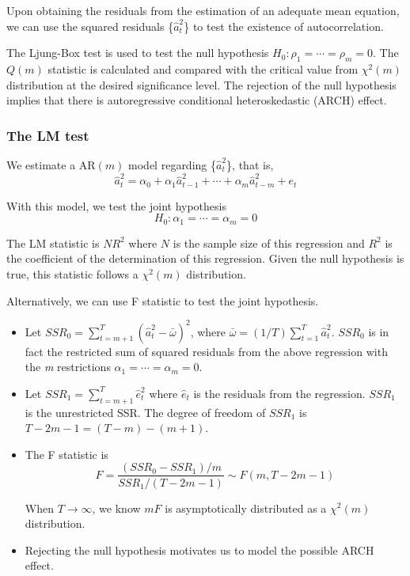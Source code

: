 \documentclass[a4paper,11pt]{article}
\begin{document}
Upon obtaining the residuals from the estimation
of an adequate mean equation, we can use the squared residuals
\{\(\hat{a}_t^2\)\} to test the existence of autocorrelation. 

The Ljung-Box test is used to test the null hypothesis
\(H_0: \rho_1 = \cdots = \rho_m = 0\). The \(Q(m)\) statistic is
calculated and compared with the critical value from \(\chi^2(m)\)
distribution at the desired significance level. The rejection of the
null hypothesis implies that there is autoregressive conditional
heteroskedastic (ARCH) effect. 

\subsubsection*{The LM test}
\label{sec:orgd511c79}

We estimate a AR\((m)\) model regarding \{\(\hat{a}^2_t\)\}, that is,
\[ \hat{a}^2_t = \alpha_0 + \alpha_1 \hat{a}_{t-1}^2 + \cdots +
\alpha_m \hat{a}^2_{t-m} + e_t \]

With this model, we test the joint hypothesis
\[H_0: \alpha_1 = \cdots = \alpha_m = 0 \]

The LM statistic is \(NR^2\) where \(N\) is the sample size of this
regression and \(R^2\) is the coefficient of the determination of this
regression. Given the null hypothesis is true, this statistic follows
a \(\chi^2(m)\) distribution. 

Alternatively, we can use F statistic to test the joint
hypothesis. 
\begin{itemize}
\item Let \(SSR_0 = \sum_{t=m+1}^{T} (\hat{a}^2_{t} -
  \bar{\omega})^2\), where \(\bar{\omega} = (1/T) \sum_{t=1}^T
  \hat{a}^2_t\). \(SSR_0\) is in fact the restricted sum of squared
residuals from the above regression with the \emph{m} restrictions
\(\alpha_1 = \cdots = \alpha_m = 0\).
\item Let \(SSR_1 = \sum_{t=m+1}^T \hat{e}^2_t\) where \(\hat{e}_t\) is the
residuals from the regression. \(SSR_1\) is the unrestricted SSR. The
degree of freedom of \(SSR_1\) is \(T-2m-1 = (T-m) - (m+1)\).
\item The F statistic is
\[F = \frac{(SSR_0 - SSR_1)/m}{SSR_1/(T-2m-1)} \sim F(m, T-2m-1)\]

When \(T \rightarrow \infty\), we know \(mF\) is asymptotically
distributed as a \(\chi^2(m)\) distribution.

\item Rejecting the null hypothesis motivates us to model the possible
ARCH effect.
\end{itemize}
\end{document}
